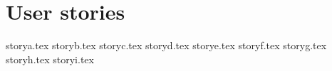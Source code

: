\section{User stories}\label{appendix:acres}
{storya.tex}
{storyb.tex}
{storyc.tex}
{storyd.tex}
{storye.tex}
{storyf.tex}
{storyg.tex}
{storyh.tex}
{storyi.tex}